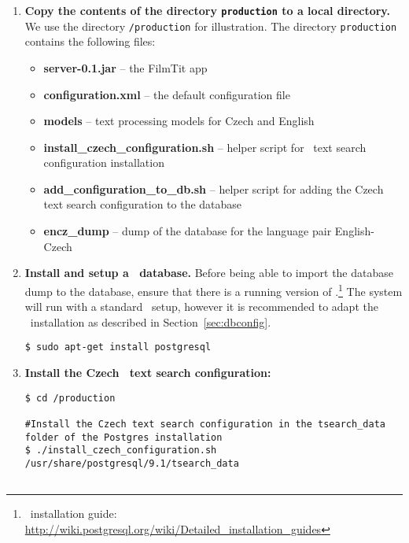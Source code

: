 \begin{enumerate}

\item \textbf{Copy the contents of the directory {\tt production} to a local directory.} We use the directory {\tt /production} for illustration. The directory {\tt production} contains the following files:

\begin{itemize}
	\item \textbf{server-0.1.jar} -- the FilmTit app
	\item \textbf{configuration.xml} -- the default configuration file
	\item \textbf{models} -- text processing models for Czech and English
	\item \textbf{install\_czech\_configuration.sh} -- helper script for \postgres~text search configuration installation
	\item \textbf{add\_configuration\_to\_db.sh} -- helper script for adding the Czech text search configuration to the database
	\item \textbf{encz\_dump} -- dump of the database for the language pair English-Czech
\end{itemize}

\item \textbf{Install and setup a \postgres~database.} Before being able to import the database dump to the database, ensure that there is a running version of \postgres.\footnote{\postgres~installation guide: \url{http://wiki.postgresql.org/wiki/Detailed_installation_guides}} The system will run with a standard \postgres~setup, however it is recommended to adapt the \postgres~installation as described in Section~\ref{sec:dbconfig}.

\vspace*{0.5em}
\begin{lstlisting}
$ sudo apt-get install postgresql
\end{lstlisting}
\vspace*{0.5em}


\item \textbf{Install the Czech \postgres~text search configuration:}
\vspace*{0.5em}
\begin{lstlisting}
$ cd /production

#Install the Czech text search configuration in the tsearch_data folder of the Postgres installation
$ ./install_czech_configuration.sh /usr/share/postgresql/9.1/tsearch_data


\end{lstlisting}
\end{enumerate}
